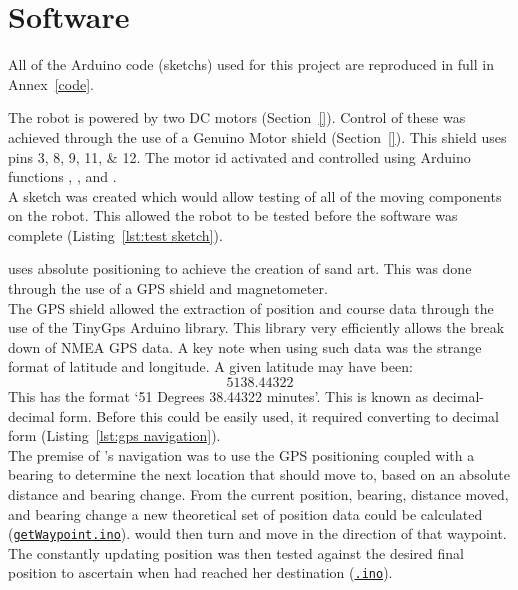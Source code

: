 \chapter{Software}\label{software}\label{section \thechapter}
\noindent All of the \gls{Arduino} code (\glspl{sketch}) used for this project are reproduced in full in Annex~\ref{code}.

    \begin{listing}[bth]
        \caption{Code used to test the moving components of the robot. This sketch was written by \AG. (Lines 82--106 from \hyperref[ino:test_routine]{test\_routine.ino})%
        }%
        \label{lst:test sketch}
    \end{listing}
    The robot is powered by two DC motors (Section~\ref{}). Control of these was achieved through the use of a \gls{Genuino} Motor \Gls{shield} (Section~\ref{}). This shield uses pins \numlist{3;8;9;11;12}. The motor id activated and controlled using Arduino functions , , and .\\
    A \gls{sketch} was created which would allow testing of all of the moving components on the robot. This allowed the robot to be tested before the software was complete (Listing~\ref{lst:test sketch}).

    \begin{listing}[bth]
        \caption{Code used to convert \gls{NMEA} data to decimal form. This sketch was written by \AG. (Lines 81--109 from \hyperref[ino:gps_navigation]{gps\_navigation.ino})%
        }%
        \label{lst:gps navigation}
    \end{listing}
    \SandE uses absolute positioning to achieve the creation of sand art. This was done through the use of a \gls{GPS} \gls{shield} and \gls{magnetometer}.\\
    The \gls{GPS} \gls{shield} allowed the extraction of position and course data through the use of the TinyGps Arduino \gls{library}. This \gls{library} very efficiently allows the break down of \gls{NMEA} GPS data. A key note when using such data was the strange format of latitude and longitude. A given latitude may have been: $$5138.44322$$ This has the format `51 Degrees 38.44322 minutes'.
    This is known as decimal-decimal form. Before this could be easily used, it required converting to decimal form (Listing~\ref{lst:gps navigation}).\\
    The premise of \SandE's navigation was to use the \gls{GPS} positioning coupled with a bearing to determine the next location that \SandE should move to, based on an absolute distance and bearing change. From the current position, bearing, distance moved, and bearing change a new theoretical set of position data could be calculated (\hyperref[ino:getWaypoint]{\texttt{getWaypoint.ino}}). \SandE would then turn and move in the direction of that waypoint. The constantly updating position was then tested against the desired final position to ascertain when \SandE had reached her destination (\hyperref[ino:]{\texttt{\?.ino}}).

